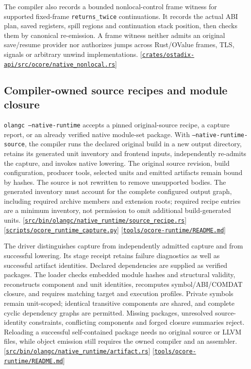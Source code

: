 \documentclass[11pt,oneside]{article}
\newcommand{\src}[1]{\textcolor{OSlate}{\scriptsize[\href{https://github.com/lostadi/OSTADIX/blob/c0b02c326b2329a95ba52447c7180bc93957cd57/#1}{\nolinkurl{#1}}]}\allowbreak}
\newcommand{\breakcode}[1]{\texttt{\seqsplit{#1}}}
\begin{document}
The compiler also records a bounded nonlocal-control frame witness for
supported fixed-frame \texttt{returns\_twice} continuations. It records the
actual ABI plan, saved registers, spill regions and continuation stack
position, then checks them by canonical re-emission. A frame witness neither
admits an original save/resume provider nor authorizes jumps across
Rust/OValue frames, TLS, signals or arbitrary unwind implementations.
\src{crates/ostadix-api/src/ocore/native_nonlocal.rs}

\subsection{Compiler-owned source recipes and module closure}

\texttt{olangc --native-runtime} accepts a pinned original-source recipe, a
capture report, or an already verified native module-set package. With
\texttt{--native-runtime-source}, the compiler runs the declared original
build in a new output directory, retains its generated unit inventory and
frontend inputs, independently re-admits the capture, and invokes native
lowering. The original source revision, build configuration, producer tools,
selected units and emitted artifacts remain bound by hashes. The source is
not rewritten to remove unsupported bodies. The generated inventory must
account for the complete configured output graph, including required archive
members and extension roots; required recipe entries are a minimum inventory,
not permission to omit additional build-generated units.
\src{src/bin/olangc/native_runtime/source_recipe.rs}
\src{scripts/ocore_runtime_capture.py}
\src{tools/ocore-runtime/README.md}

The driver distinguishes capture from independently admitted capture and from
successful lowering. Its stage receipt retains failure diagnostics as well
as successful artifact identities. Declared dependencies are supplied as
verified \breakcode{ocore-native-module-set-v1} packages. The loader checks
embedded module hashes and structural validity, reconstructs component and
unit identities, recomputes symbol/ABI/COMDAT closure, and requires matching
target and execution profiles. Private symbols remain unit-scoped; identical
transitive components are shared, and complete cyclic dependency graphs are
permitted. Missing packages, unresolved source-identity constraints, conflicting
components and forged closure summaries reject. Reloading a successful
self-contained package needs no original source or LLVM files, while object
emission still requires the owned compiler and an assembler.
\src{src/bin/olangc/native_runtime/artifact.rs}
\src{tools/ocore-runtime/README.md}
\end{document}

